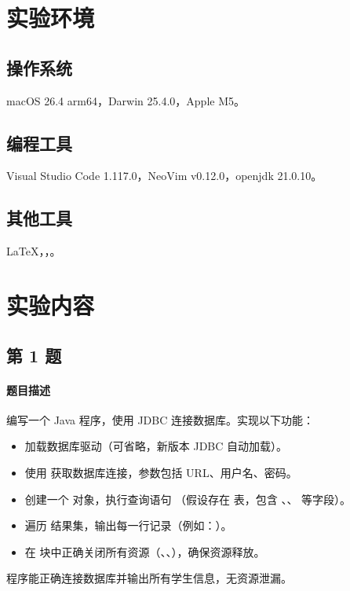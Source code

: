 \documentclass{academics}
\begin{document}
\makeacademicscover

\section{实验环境}

\subsection{操作系统}

macOS 26.4 arm64，Darwin 25.4.0，Apple M5。

\subsection{编程工具}

Visual Studio Code 1.117.0，NeoVim v0.12.0，openjdk 21.0.10。

\subsection{其他工具}

\LaTeX{}，，。

\section{实验内容}

\subsection{第 1 题}

\paragraph{题目描述} {
    编写一个 Java 程序，使用 JDBC 连接数据库。实现以下功能：
    \begin{itemize}
        \item 加载数据库驱动（可省略，新版本 JDBC 自动加载）。
        \item 使用  获取数据库连接，参数包括 URL、用户名、密码。
        \item 创建一个  对象，执行查询语句 （假设存在  表，包含 、、 等字段）。
        \item 遍历  结果集，输出每一行记录（例如：）。
        \item 在  块中正确关闭所有资源（、、），确保资源释放。
    \end{itemize}
    程序能正确连接数据库并输出所有学生信息，无资源泄漏。
}
\end{document}
